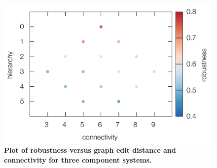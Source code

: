 \pagebreak

\begin{figure}[!ht]
\centering
\noindent\includegraphics[width=0.7\columnwidth]{fig/connectdist3D3x3.pdf}
\caption{{\bf Plot of robustness versus graph edit distance and connectivity for three component systems.} }
\label{fig:connectdist3D3x3}
\end{figure}


